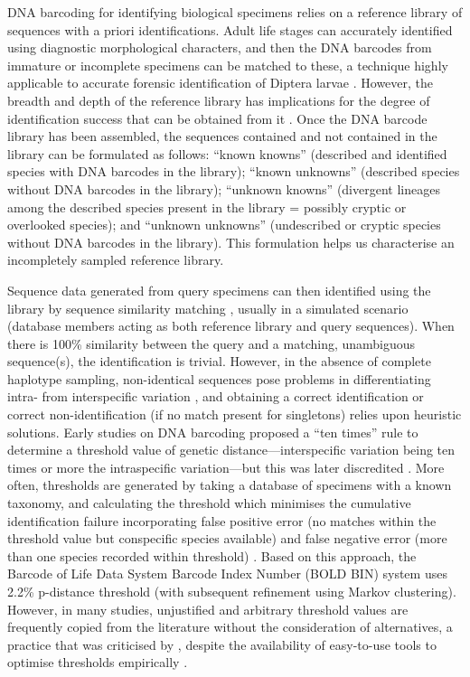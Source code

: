 \documentclass[12pt]{article}
\begin{document}
DNA barcoding for identifying biological specimens relies on a reference library of sequences with a priori identifications. Adult life stages can accurately identified using diagnostic morphological characters, and then the DNA barcodes from immature or incomplete specimens can be matched to these, a technique highly applicable to accurate forensic identification of Diptera larvae \citep{Meiklejohn2011}. However, the breadth and depth of the reference library has implications for the degree of identification success that can be obtained from it \citep{Bergsten2012,Virgilio2012,Zhang2010}. Once the DNA barcode library has been assembled, the sequences contained and not contained in the library can be formulated as follows: ``known knowns'' (described and identified species with DNA barcodes in the library); ``known unknowns'' (described species without DNA barcodes in the library); ``unknown knowns'' (divergent lineages among the described species present in the library = possibly cryptic or overlooked species); and ``unknown unknowns'' (undescribed or cryptic species without DNA barcodes in the library). This formulation helps us characterise an incompletely sampled reference library.

Sequence data generated from query specimens can then identified using the library by sequence similarity matching \citep{Meier2006}, usually in a simulated scenario (database members acting as both reference library and query sequences). When there is 100\% similarity between the query and a matching, unambiguous sequence(s), the identification is trivial. However, in the absence of complete haplotype sampling, non-identical sequences pose problems in differentiating intra- from interspecific variation \citep{Virgilio2012}, and obtaining a correct identification or correct non-identification (if no match present for singletons) relies upon heuristic solutions. Early studies on DNA barcoding \citep{Hebert2004} proposed a ``ten times'' rule to determine a threshold value of genetic distance---interspecific variation being ten times or more the intraspecific variation---but this was later discredited \citep{Hickerson2006}. More often, thresholds are generated by taking a database of specimens with a known taxonomy, and calculating the threshold which minimises the cumulative identification failure incorporating false positive error (no matches within the threshold value but conspecific species available) and false negative error (more than one species recorded within threshold) \citep{Meyer2005}. Based on this approach, the Barcode of Life Data System Barcode Index Number (BOLD BIN) system \citep{Ratnasingham2013} uses 2.2\% p-distance threshold (with subsequent refinement using Markov clustering). However, in many studies, unjustified and arbitrary threshold values are frequently copied from the literature without the consideration of alternatives, a practice that was criticised by \citet{Collins2013}, despite the availability of easy-to-use tools to optimise thresholds empirically \citep{Puillandre2012,Virgilio2012,Sonet2013,Brown2012}.
\end{document}
